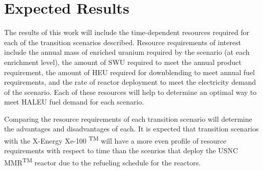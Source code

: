 \section{Expected Results}

The results of this work will include the time-dependent resources required 
for each of the transition scenarios described. Resource requirements
of interest include the annual mass of enriched uranium required by 
the scenario (at each enrichment level), the amount of 
\gls{SWU} required to meet the annual product requirement, the amount 
of \gls{HEU} required for downblending to meet annual fuel requirements, 
and the rate of reactor deployment to meet the 
electricity demand of the scenario. Each of these resources will help
to determine an optimal way to meet \gls{HALEU} fuel demand for each 
scenario. 

Comparing the resource requirements of each transition scenario will 
determine the advantages and disadvantages of each. It is expected that 
transition scenarios with the X-Energy 
Xe-100 \textsuperscript{TM} will have a more even profile of resource 
requirements with respect to time than the scenrios that deploy the 
\gls{USNC} \gls{MMR}\textsuperscript{TM} reactor due to the refueling 
schedule for the reactors. 

